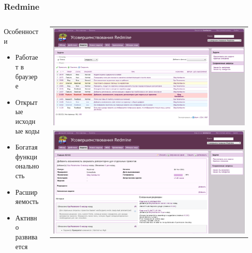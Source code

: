 \documentclass[unicode]{beamer}
\begin{document}
\begin{frame}
\transwipe[direction=90]
\frametitle{Redmine}
\begin{columns}
\begin{column}{0.4\textwidth}
\begin{block}{Особенности}
\small
\begin{itemize}
  \item Работает в браузере
  \item Открытые исходные коды
  \item Богатая функциональность
  \item Расширяемость
  \item Активно развивается
\end{itemize}
\end{block}
\end{column}
\begin{column}{0.6\textwidth}
\begin{tabular}{ c }
\includegraphics[width=1\textwidth]{redmine-issues.png}\\
\includegraphics[width=1\textwidth]{redmine-issue.png}\\
\end{tabular}
\end{column}
\end{columns}
\end{frame}
\end{document}

